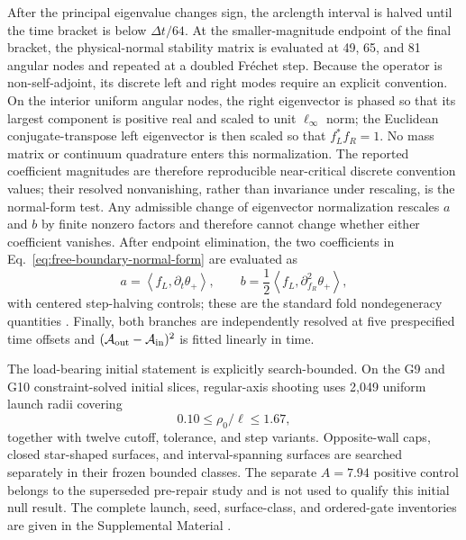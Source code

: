 \documentclass[11pt]{article}
\begin{document}
After the principal eigenvalue changes sign, the arclength interval is halved
until the time bracket is below $\Delta t/64$.  At the smaller-magnitude
endpoint of the final bracket, the physical-normal stability matrix is
evaluated at 49, 65, and 81
angular nodes and repeated at a doubled Fr\'echet step.  Because the operator
is non-self-adjoint, its discrete left and right modes require an explicit
convention.  On the interior uniform angular nodes, the right eigenvector is
phased so that its largest component is positive real and scaled to unit
$\ell_\infty$ norm; the Euclidean conjugate-transpose left eigenvector is then
scaled so that $f_L^*f_R=1$.  No mass matrix or continuum quadrature enters
this normalization.  The reported coefficient magnitudes are therefore
reproducible near-critical discrete convention values; their resolved
nonvanishing, rather than invariance under rescaling, is the normal-form test.
Any admissible change of eigenvector normalization rescales $a$ and $b$ by
finite nonzero factors and therefore cannot change whether either coefficient
vanishes.
After endpoint elimination, the two coefficients in
Eq.~\eqref{eq:free-boundary-normal-form} are evaluated as
\begin{equation}
a=\left\langle f_L,\partial_t\theta_+\right\rangle,
\qquad
b=\frac12\left\langle f_L,
\partial_{f_R}^2\theta_+\right\rangle,
\label{eq:normal-form-coefficients}
\end{equation}
with centered step-halving controls; these are the standard fold
nondegeneracy quantities \cite{Kuznetsov2004}.  Finally, both branches are independently
resolved at five prespecified time offsets and
$(\mathcal A_{\rm out}-\mathcal A_{\rm in})^2$ is fitted linearly in time.

The load-bearing initial statement is explicitly search-bounded.  On the G9
and G10 constraint-solved initial slices, regular-axis shooting uses 2,049
uniform launch radii covering
\begin{equation}
0.10\leq\rho_0/\ell\leq1.67,
\end{equation}
together with twelve cutoff, tolerance, and step variants.  Opposite-wall
caps, closed star-shaped surfaces, and interval-spanning surfaces are searched
separately in their frozen bounded classes.  The separate $A=7.94$ positive
control belongs to the superseded pre-repair study and is not used to qualify
this initial null result.
The complete launch, seed, surface-class, and ordered-gate inventories are
given in the Supplemental Material \cite{SupplementalMaterial}.
\end{document}
